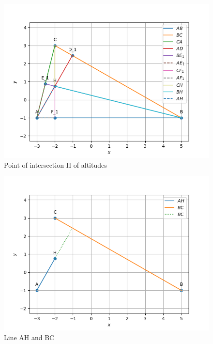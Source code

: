 \documentclass[journal,12pt,twocolumn]{IEEEtran}
\theoremstyle{remark}
\begin{document}
\begin{figure}[!ht]
              \centering
              \includegraphics[width=\columnwidth]{./figs/fig1.3.4.png}
              \caption{Point of intersection H of altitudes}
              \label{fig:9}
\end{figure}
\begin{figure}[!ht]
              \centering
              \includegraphics[width=\columnwidth]{./figs/fig1.3.5.png}
              \caption{Line AH and BC}
              \label{fig:10}
\end{figure}
\end{document}
